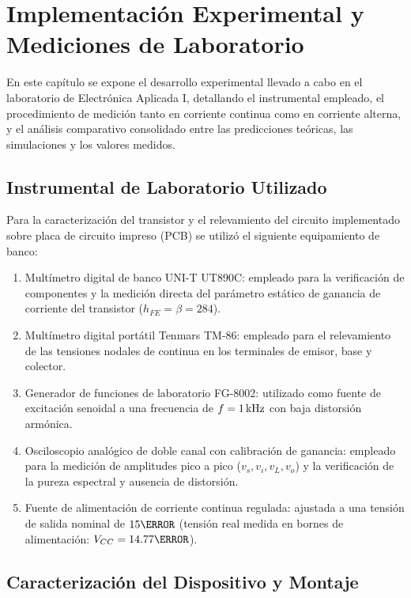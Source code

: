 \chapter{Implementación Experimental y Mediciones de Laboratorio}
\label{chap:mediciones_laboratorio}

En este capítulo se expone el desarrollo experimental llevado a cabo en el laboratorio de Electrónica Aplicada I,
detallando el instrumental empleado, el procedimiento de medición tanto en corriente continua como en corriente
alterna, y el análisis comparativo consolidado entre las predicciones teóricas, las simulaciones y los valores medidos.

\section{Instrumental de Laboratorio Utilizado}

Para la caracterización del transistor y el relevamiento del circuito implementado sobre placa de circuito impreso (PCB)
se utilizó el siguiente equipamiento de banco:
\begin{enumerate}
  \item Multímetro digital de banco UNI-T UT890C: empleado para la verificación de componentes y la medición directa del
    parámetro estático de ganancia de corriente del transistor ($h_{FE} = \beta = 284$).
  \item Multímetro digital portátil Tenmars TM-86: empleado para el relevamiento de las tensiones nodales de continua en
    los terminales de emisor, base y colector.
  \item Generador de funciones de laboratorio FG-8002: utilizado como fuente de excitación senoidal a una frecuencia de
    $f = 1\,\mathrm{kHz}$ con baja distorsión armónica.
  \item Osciloscopio analógico de doble canal con calibración de ganancia: empleado para la medición de amplitudes pico
    a pico ($v_s, v_i, v_L, v_o$) y la verificación de la pureza espectral y ausencia de distorsión.
  \item Fuente de alimentación de corriente continua regulada: ajustada a una tensión de salida nominal de $15\V$
    (tensión real medida en bornes de alimentación: $V_{CC} = 14.77\V$).
\end{enumerate}

\section{Caracterización del Dispositivo y Montaje}

